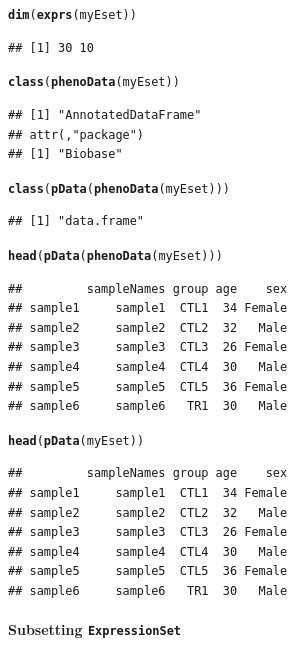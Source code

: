 \documentclass[a4paper]{article}\usepackage[]{graphicx}\usepackage[]{color}
\makeatletter
\newcommand{\hlstd}[1]{\textcolor[rgb]{0.345,0.345,0.345}{#1}}%
\newcommand{\hlkwd}[1]{\textcolor[rgb]{0.737,0.353,0.396}{\textbf{#1}}}%
\newenvironment{kframe}{%
 \def\at@end@of@kframe{}%
 \ifinner\ifhmode%
  \def\at@end@of@kframe{\end{minipage}}%
  \begin{minipage}{\columnwidth}%
 \fi\fi%
 \def\FrameCommand##1{\hskip\@totalleftmargin \hskip-\fboxsep
 \colorbox{shadecolor}{##1}\hskip-\fboxsep
     \hskip-\linewidth \hskip-\@totalleftmargin \hskip\columnwidth}%
 \MakeFramed {\advance\hsize-\width
   \@totalleftmargin\z@ \linewidth\hsize
   \@setminipage}}%
 {\par\unskip\endMakeFramed%
 \at@end@of@kframe}
\newenvironment{knitrout}{}{} %
\makeatother
\begin{document}
\begin{knitrout}
\color{fgcolor}\begin{kframe}
\begin{alltt}
\hlkwd{dim}\hlstd{(}\hlkwd{exprs}\hlstd{(myEset))}
\end{alltt}
\begin{verbatim}
## [1] 30 10
\end{verbatim}
\begin{alltt}
\hlkwd{class}\hlstd{(}\hlkwd{phenoData}\hlstd{(myEset))}
\end{alltt}
\begin{verbatim}
## [1] "AnnotatedDataFrame"
## attr(,"package")
## [1] "Biobase"
\end{verbatim}
\begin{alltt}
\hlkwd{class}\hlstd{(}\hlkwd{pData}\hlstd{(}\hlkwd{phenoData}\hlstd{(myEset)))}
\end{alltt}
\begin{verbatim}
## [1] "data.frame"
\end{verbatim}
\begin{alltt}
\hlkwd{head}\hlstd{(}\hlkwd{pData}\hlstd{(}\hlkwd{phenoData}\hlstd{(myEset)))}
\end{alltt}
\begin{verbatim}
##         sampleNames group age    sex
## sample1     sample1  CTL1  34 Female
## sample2     sample2  CTL2  32   Male
## sample3     sample3  CTL3  26 Female
## sample4     sample4  CTL4  30   Male
## sample5     sample5  CTL5  36 Female
## sample6     sample6   TR1  30   Male
\end{verbatim}
\begin{alltt}
\hlkwd{head}\hlstd{(}\hlkwd{pData}\hlstd{(myEset))}
\end{alltt}
\begin{verbatim}
##         sampleNames group age    sex
## sample1     sample1  CTL1  34 Female
## sample2     sample2  CTL2  32   Male
## sample3     sample3  CTL3  26 Female
## sample4     sample4  CTL4  30   Male
## sample5     sample5  CTL5  36 Female
## sample6     sample6   TR1  30   Male
\end{verbatim}
\end{kframe}
\end{knitrout}

\paragraph{Subsetting \texttt{ExpressionSet}}
\end{document}
